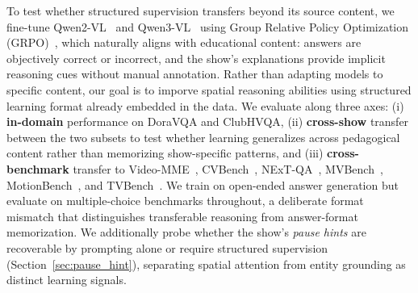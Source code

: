 \documentclass{article}
\begin{document}
To test whether structured supervision transfers beyond its source content, we fine-tune Qwen2-VL~\cite{wang2024qwen2vl} and Qwen3-VL~\cite{yang2025qwen3} using Group Relative Policy Optimization (GRPO)~\cite{shao2024deepseekmath}, which naturally aligns with educational content: answers are objectively correct or incorrect, and the show's explanations provide implicit reasoning cues without manual annotation. Rather than adapting models to specific content, our goal is to imporve spatial reasoning abilities using structured learning format already embedded in the data. We evaluate along three axes: (i) \textbf{in-domain} performance on DoraVQA and ClubHVQA, (ii) \textbf{cross-show} transfer between the two subsets to test whether learning generalizes across pedagogical content rather than memorizing show-specific patterns, and (iii) \textbf{cross-benchmark} transfer to Video-MME~\cite{fu2025video}, CVBench~\cite{zhu2025cvbench}, NExT-QA~\cite{xiao2021next}, MVBench~\cite{li2024mvbench}, MotionBench~\cite{hong2025motionbench}, and TVBench~\cite{cores2024tvbench}. We train on open-ended answer generation but evaluate on multiple-choice benchmarks throughout, a deliberate format mismatch that distinguishes transferable reasoning from answer-format memorization. We additionally probe whether the show's \textit{pause hints} are recoverable by prompting alone or require structured supervision (Section~\ref{sec:pause_hint}), separating spatial attention from entity grounding as distinct learning signals.
 

\end{document}
